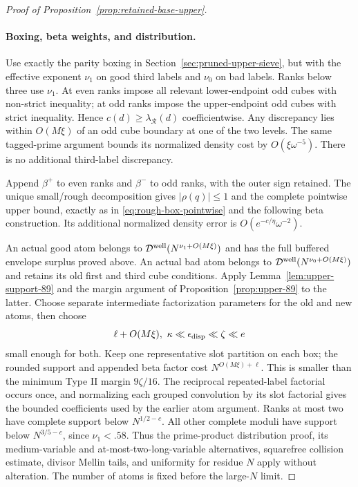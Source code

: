 \begin{proof}[Proof of Proposition~\ref{prop:retained-base-upper}]
\paragraph{Boxing, beta weights, and distribution.}
Use exactly the parity boxing in Section~\ref{sec:pruned-upper-sieve},
but with the effective exponent $\nu_1$ on good third labels and
$\nu_0$ on bad labels. Ranks below three use $\nu_1$.
At even ranks impose all relevant lower-endpoint odd cubes with
non-strict inequality; at odd ranks impose the upper-endpoint
odd cubes with strict inequality. Hence $c(d)\ge\lambda_{\mathcal R}(d)$
coefficientwise. Any discrepancy lies within $O(M\xi)$ of an odd
cube boundary at one of the two levels. The same tagged-prime
argument bounds its normalized density cost by $O(\xi\omega^{-5})$.
There is no additional third-label discrepancy.

Append $\beta^+$ to even ranks and $\beta^-$ to odd ranks, with
the outer sign retained. The unique small/rough decomposition gives
$|\rho(q)|\le1$ and the complete pointwise upper bound, exactly as
in \eqref{eq:rough-box-pointwise} and the following beta construction.
Its additional normalized density error is
$O(e^{-c/\eta}\omega^{-2})$.

An actual good atom belongs to
$\mathcal D^{\rm well}(N^{\nu_1+O(M\xi)})$ and has the full
buffered envelope surplus proved above. An actual bad atom belongs
to $\mathcal D^{\rm well}(N^{\nu_0+O(M\xi)})$ and retains its
old first and third cube conditions. Apply
Lemma~\ref{lem:upper-support-89} and the margin argument of
Proposition~\ref{prop:upper-89} to the latter. Choose separate
intermediate factorization parameters for the old and new atoms,
then choose
\[
 \ell+O(M\xi),\ \kappa\ll\epsilon_{\rm disp}\ll\zeta\ll e
\]
small enough for both. Keep one representative slot partition on
each box; the rounded support and appended beta factor cost
$N^{O(M\xi)+\ell}$. This is smaller than the minimum Type II
margin $9\zeta/16$. The reciprocal repeated-label factorial occurs
once, and normalizing each grouped convolution by its slot factorial
gives the bounded coefficients used by the earlier atom argument.
Ranks at most two have complete support below $N^{1/2-c}$.
All other complete moduli have support below $N^{3/5-c}$, since
$\nu_1<.58$. Thus the prime-product distribution proof, its
medium-variable and at-most-two-long-variable alternatives,
squarefree collision estimate, divisor Mellin tails, and uniformity
for residue $N$ apply without alteration. The number of atoms is
fixed before the large-$N$ limit.


\end{proof}
